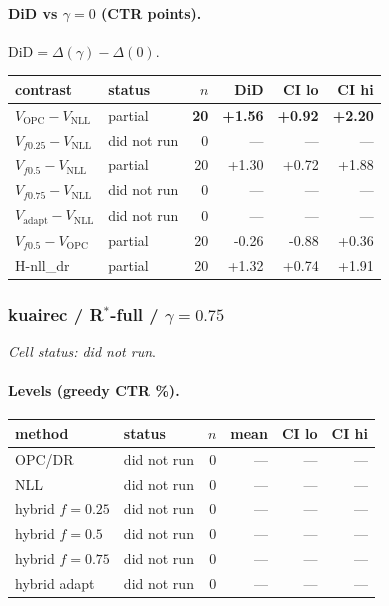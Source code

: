 \documentclass[10pt,a4paper]{article}
\begin{document}
\paragraph{DiD vs $\gamma=0$ (CTR points).} $\mathrm{DiD}=\Delta(\gamma)-\Delta(0)$.
{\centering\small\begin{tabular}{llrrrr}
\toprule contrast & status & $n$ & DiD & CI lo & CI hi \\
\midrule
\textbf{$V_{\mathrm{OPC}}-V_{\mathrm{NLL}}$} & partial & \textbf{20} & \textbf{+1.56} & \textbf{+0.92} & \textbf{+2.20} \\
$V_{f0.25}-V_{\mathrm{NLL}}$ & did not run & 0 & --- & --- & --- \\
$V_{f0.5}-V_{\mathrm{NLL}}$ & partial & 20 & +1.30 & +0.72 & +1.88 \\
$V_{f0.75}-V_{\mathrm{NLL}}$ & did not run & 0 & --- & --- & --- \\
$V_{\mathrm{adapt}}-V_{\mathrm{NLL}}$ & did not run & 0 & --- & --- & --- \\
$V_{f0.5}-V_{\mathrm{OPC}}$ & partial & 20 & -0.26 & -0.88 & +0.36 \\
H-nll\_dr & partial & 20 & +1.32 & +0.74 & +1.91 \\
\bottomrule\end{tabular}\par}
\bigskip
\subsubsection{kuairec / R$^*$-full / $\gamma=0.75$}
\emph{Cell status: did not run}.
\paragraph{Levels (greedy CTR \%).}
{\centering\small\begin{tabular}{llrrrr}
\toprule method & status & $n$ & mean & CI lo & CI hi \\
\midrule
OPC/DR & did not run & 0 & --- & --- & --- \\
NLL & did not run & 0 & --- & --- & --- \\
hybrid $f{=}0.25$ & did not run & 0 & --- & --- & --- \\
hybrid $f{=}0.5$ & did not run & 0 & --- & --- & --- \\
hybrid $f{=}0.75$ & did not run & 0 & --- & --- & --- \\
hybrid adapt & did not run & 0 & --- & --- & --- \\
\bottomrule\end{tabular}\par}
\end{document}
